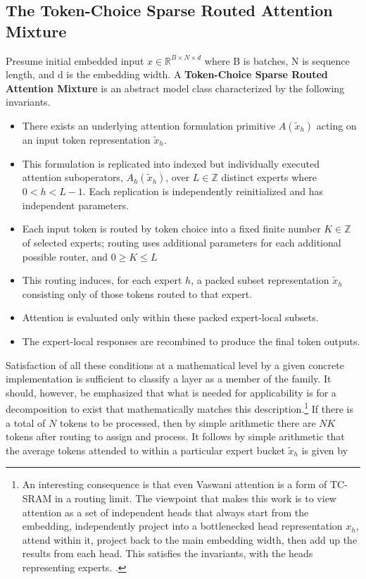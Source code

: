 \documentclass[11pt]{article}
\begin{document}
\subsection{The Token-Choice Sparse Routed Attention Mixture}

Presume initial embedded input $x \in \mathbb{R}^{B \times N \times d}$ where B is batches, N is sequence length, and d is the embedding width. A \textbf{Token-Choice Sparse Routed Attention Mixture} is an abstract model class characterized by the following invariants.

\begin{itemize}
    \item There exists an underlying attention formulation primitive $A(\tilde{x}_h)$ acting on an input token representation $\tilde{x}_h$.
    \item This formulation is replicated into indexed but individually executed attention suboperators, $A_h(\tilde{x}_h)$, over $L \in \mathbb{Z}$ distinct experts where $0 < h < L-1$. Each replication is independently reinitialized and has independent parameters.
    \item Each input token is routed by token choice into a fixed finite number $K \in \mathbb{Z}$ of selected experts; routing uses additional parameters for each additional possible router, and $0 \geq K\leq L$
    \item This routing induces, for each expert $h$, a packed subset representation $\tilde{x}_h$ consisting only of those tokens routed to that expert.
    \item Attention is evaluated only within these packed expert-local subsets.
    \item The expert-local responses are recombined to produce the final token outputs.
\end{itemize}

Satisfaction of all these conditions at a mathematical level by a given concrete implementation is sufficient to classify a layer as a member of the family. It should, however, be emphasized that what is needed for applicability is for a decomposition to exist that mathematically matches this description.\footnote{An interesting consequence is that even Vaswani attention is a form of TC-SRAM in a routing limit. The viewpoint that makes this work is to view attention as a set of independent heads that always start from the embedding, independently project into a bottlenecked head representation $x_h$, attend within it, project back to the main embedding width, then add up the results from each head. This satisfies the invariants, with the heads representing experts.  \citep{vaswani2017attention, wang2023interpretability}.} If there is a total of $N$ tokens to be processed, then by simple arithmetic there are $NK$ tokens after routing to assign and process. It follows by simple arithmetic that the average tokens attended to within a particular expert bucket $\tilde{x}_h$ is given by
\end{document}

